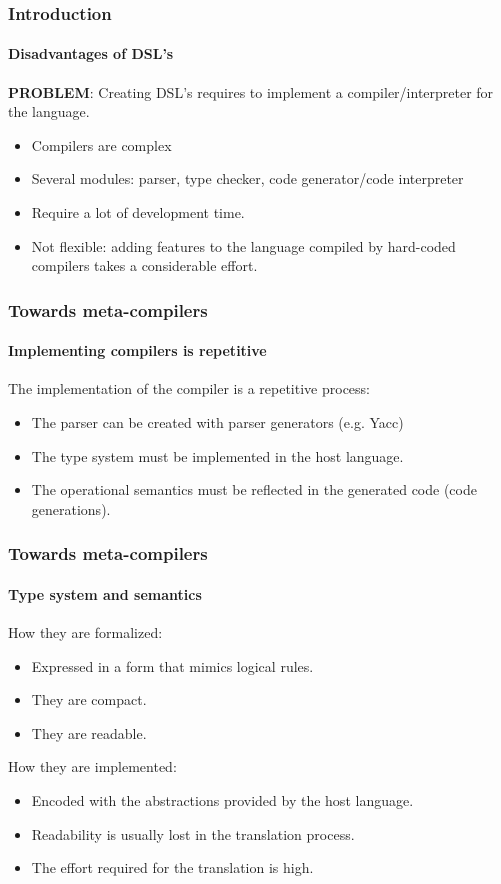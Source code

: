 \documentclass[mathserif,serif]{beamer}
\begin{document}
\begin{frame}
	\frametitle{Introduction}
	\framesubtitle{Disadvantages of DSL's}
	
	\textbf{PROBLEM}: Creating DSL's requires to implement a compiler/interpreter for the language.
	
	\begin{itemize}
		\item Compilers are complex
		\item Several modules: parser, type checker, code generator/code interpreter
		\item Require a lot of development time.
		\item Not flexible: adding features to the language compiled by hard-coded compilers takes a considerable effort.
	\end{itemize}
\end{frame}

\begin{frame}
	\frametitle{Towards meta-compilers}
	\framesubtitle{Implementing compilers is repetitive}
	
	The implementation of the compiler is a repetitive process:
	\begin{itemize}
		\item The parser can be created with parser generators (e.g. Yacc)
		\item The type system must be implemented in the host language.
		\item The operational semantics must be reflected in the generated code (code generations).
	\end{itemize}
\end{frame}

\begin{frame}
	\frametitle{Towards meta-compilers}
	\framesubtitle{Type system and semantics}
	
	How they are formalized:
	\begin{itemize}
		\item Expressed in a form that mimics logical rules.
		\item They are compact.
		\item They are readable.
	\end{itemize}
	
	How they are implemented:
	\begin{itemize}
		\item Encoded with the abstractions provided by the host language.
		\item Readability is usually lost in the translation process.
		\item The effort required for the translation is high.
	\end{itemize}
	
\end{frame}
\end{document}
